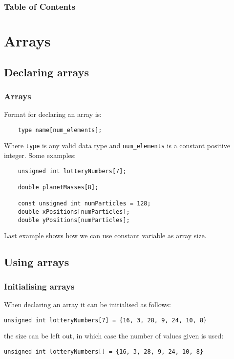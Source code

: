 \documentclass{beamer}
\subtitle{Session 3: More data types}
\begin{document}
\frame{\titlepage}

\begin{frame}
\frametitle{Table of Contents}
\tableofcontents
\end{frame}


\section{Arrays}

\subsection{Declaring arrays}

\begin{frame}[fragile]
	\frametitle{Arrays}
	
	
	Format for declaring an array is:
	\begin{lstlisting}
	type name[num_elements];
	\end{lstlisting}
	Where \texttt{type} is any valid data type and \texttt{num\_elements} is a constant positive integer.
	\pause
	Some examples:
	\begin{lstlisting}
	unsigned int lotteryNumbers[7];
	
	double planetMasses[8];
	
	const unsigned int numParticles = 128;
	double xPositions[numParticles];
	double yPositions[numParticles];
	\end{lstlisting}
	Last example shows how we can use constant variable as array size.
	
\end{frame}

\subsection{Using arrays}

\begin{frame}[fragile]
  \frametitle{Initialising arrays}
  When declaring an array it can be initialised as follows:
  \begin{lstlisting}
unsigned int lotteryNumbers[7] = {16, 3, 28, 9, 24, 10, 8}
  \end{lstlisting}
  the size can be left out, in which case the number of values given is used:
  \begin{lstlisting}
unsigned int lotteryNumbers[] = {16, 3, 28, 9, 24, 10, 8}
  \end{lstlisting}  
\end{frame}
\end{document}
